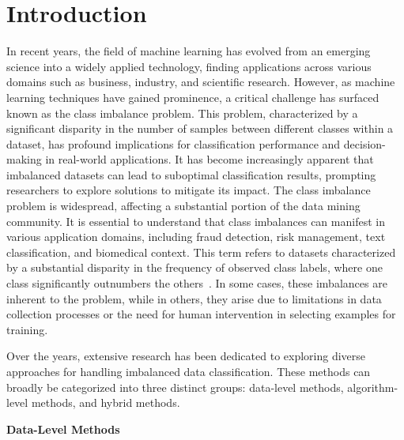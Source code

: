 \section{Introduction}

In recent years, the field of machine learning has evolved from an emerging science into a widely applied technology, finding applications across various domains such as business, industry, and scientific research. However, as machine learning techniques have gained prominence, a critical challenge has surfaced known as the class imbalance problem. This problem, characterized by a significant disparity in the number of samples between different classes within a dataset, has profound implications for classification performance and decision-making in real-world applications.
It has become increasingly apparent that imbalanced datasets can lead to suboptimal classification results, prompting researchers to explore solutions to mitigate its impact. The class imbalance problem is widespread, affecting a substantial portion of the data mining community. It is essential to understand that class imbalances can manifest in various application domains, including fraud detection, risk management, text classification, and biomedical context. This term refers to datasets characterized by a substantial disparity in the frequency of observed class labels, where one class significantly outnumbers the others~\cite{OBrien2019,Tarawneh2020}. In some cases, these imbalances are inherent to the problem, while in others, they arise due to limitations in data collection processes or the need for human intervention in selecting examples for training.

Over the years, extensive research has been dedicated to exploring diverse approaches for handling imbalanced data classification. These methods can broadly be categorized into three distinct groups: data-level methods, algorithm-level methods, and hybrid methods. 

\textbf{Data-Level Methods} 

